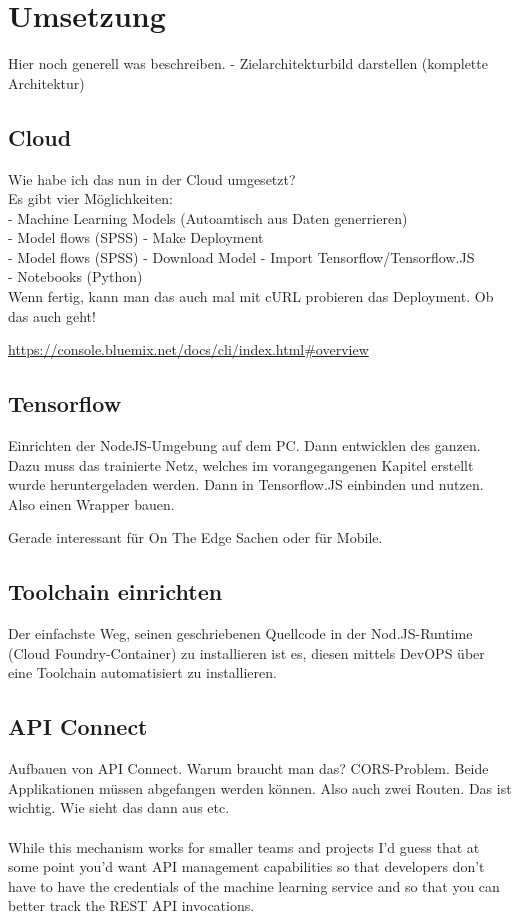 \section{Umsetzung}
Hier noch generell was beschreiben. - Zielarchitekturbild darstellen (komplette Architektur)

\subsection{Cloud}
Wie habe ich das nun in der Cloud umgesetzt?\\
Es gibt vier Möglichkeiten:\\
- Machine Learning Models (Autoamtisch aus Daten generrieren)\\
- Model flows (SPSS) - Make Deployment\\
- Model flows (SPSS) - Download Model - Import Tensorflow/Tensorflow.JS\\
- Notebooks (Python)\\

Wenn fertig, kann man das auch mal mit cURL probieren das Deployment. Ob das auch geht!

\url{https://console.bluemix.net/docs/cli/index.html#overview}

\subsection{Tensorflow}
Einrichten der NodeJS-Umgebung auf dem PC. Dann entwicklen des ganzen. Dazu muss das trainierte Netz, welches im vorangegangenen
Kapitel erstellt wurde heruntergeladen werden. Dann in Tensorflow.JS einbinden und nutzen. Also einen Wrapper bauen.

Gerade interessant für On The Edge Sachen oder für Mobile.

\subsection{Toolchain einrichten}
Der einfachste Weg, seinen geschriebenen Quellcode in der Nod.JS-Runtime (Cloud Foundry-Container) zu installieren ist es,
diesen mittels DevOPS über eine Toolchain automatisiert zu installieren.

\subsection{API Connect}
Aufbauen von API Connect. Warum braucht man das? CORS-Problem. Beide Applikationen müssen abgefangen werden können. Also
auch zwei Routen. Das ist wichtig. Wie sieht das dann aus etc.
\\ \\
While this mechanism works for smaller teams and projects I’d guess that at some point you’d want API management
capabilities so that developers don’t have to have the credentials of the machine learning service and so that you can
better track the REST API invocations.